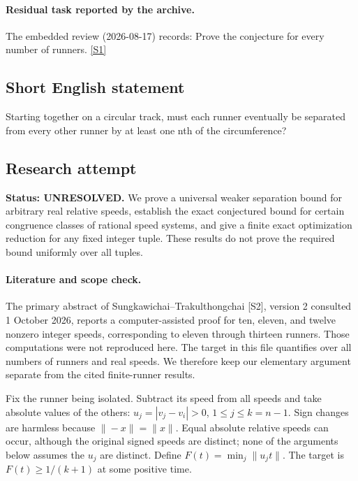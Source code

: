 \documentclass[11pt,a4paper]{article}
\newcommand{\sref}[2]{\hyperlink{source:#1:#2}{[S#2]}}
\begin{document}
\paragraph{Residual task reported by the archive.}

The embedded review (2026-08-17) records: Prove the conjecture for every number of runners. \sref{30}{1}

\subsection{Short English statement}

Starting together on a circular track, must each runner eventually be separated from every other runner by at least one nth of the circumference?

\subsection{Research attempt}
\textbf{Status: UNRESOLVED.} We prove a universal weaker separation bound for arbitrary real relative speeds, establish the exact conjectured bound for certain congruence classes of rational speed systems, and give a finite exact optimization reduction for any fixed integer tuple. These results do not prove the required bound uniformly over all tuples.

\paragraph{Literature and scope check.}
The primary abstract of Sungkawichai--Trakulthongchai [S2], version 2 consulted 1 October 2026, reports a computer-assisted proof for ten, eleven, and twelve nonzero integer speeds, corresponding to eleven through thirteen runners. Those computations were not reproduced here. The target in this file quantifies over all numbers of runners and real speeds. We therefore keep our elementary argument separate from the cited finite-runner results.

Fix the runner being isolated. Subtract its speed from all speeds and take absolute values of the others: $u_j=|v_j-v_i|>0$, $1\le j\le k=n-1$. Sign changes are harmless because $\|-x\|=\|x\|$. Equal absolute relative speeds can occur, although the original signed speeds are distinct; none of the arguments below assumes the $u_j$ are distinct. Define $F(t)=\min_j\|u_jt\|$. The target is $F(t)\ge1/(k+1)$ at some positive time.
\end{document}
